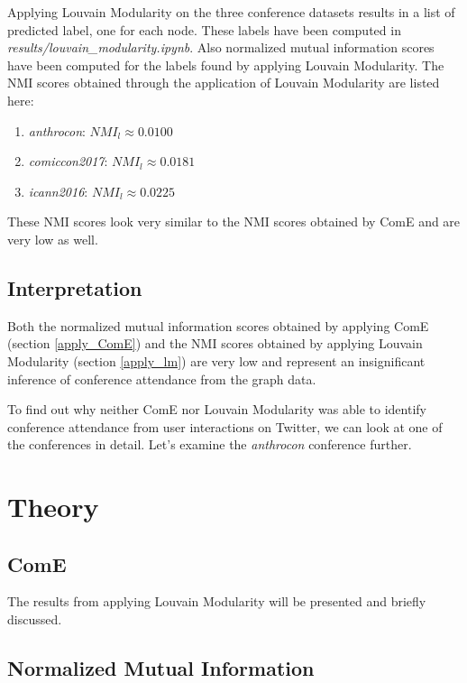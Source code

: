 \documentclass[sigconf]{acmart}
\begin{document}
Applying Louvain Modularity on the three conference datasets results in a list of predicted label, one for each node. These labels have been computed in \textit{results/louvain\_modularity.ipynb}. Also normalized mutual information scores have been computed for the labels found by applying Louvain Modularity. The NMI scores obtained through the application of Louvain Modularity are listed here:

\begin{enumerate}
	\item \textit{anthrocon}: $NMI_l \approx 0.0100$
	\item \textit{comiccon2017}: $NMI_l \approx 0.0181$
	\item \textit{icann2016}: $NMI_l \approx 0.0225$
\end{enumerate}

These NMI scores look very similar to the NMI scores obtained by ComE and are very low as well.

\subsection{Interpretation}

Both the normalized mutual information scores obtained by applying ComE (section \ref{apply_ComE}) and the NMI scores obtained by applying Louvain Modularity (section \ref{apply_lm}) are very low and represent an insignificant inference of conference attendance from the graph data.

To find out why neither ComE nor Louvain Modularity was able to identify conference attendance from user interactions on Twitter, we can look at one of the conferences in detail. Let's examine the \textit{anthrocon} conference further.



\section{Theory}

\subsection{ComE}

The results from applying Louvain Modularity will be presented and briefly discussed.

\subsection{Normalized Mutual Information} \label{nmi}
\end{document}
